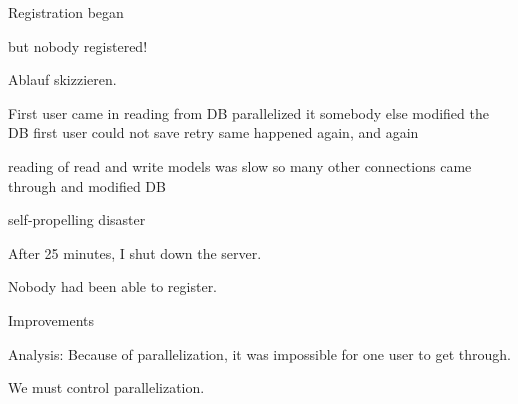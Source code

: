 \begin{frame}[fragile]{}

Registration began
                  
                  but nobody registered!
                  
\end{frame}

\begin{frame}[fragile]{}

Ablauf skizzieren. 
                  
                  First user came in
                  reading from DB parallelized it
                  somebody else modified the DB
                  first user could not save
                  retry
                  same happened again, and again
                  
                  reading of read and write models was slow
                  so many other connections came through and modified DB
                  
                  self-propelling disaster
                  
\end{frame}

\begin{frame}[fragile]{}

After 25 minutes, I shut down the server.
                  
                  Nobody had been able to register.
                  
\end{frame}

\begin{frame}[fragile]{}

{
\LARGE

Improvements
}

\end{frame}

\begin{frame}[fragile]{}

Analysis: Because of parallelization, it was impossible for one user to get through.
                  
                  We must control parallelization.
                  
\end{frame}

